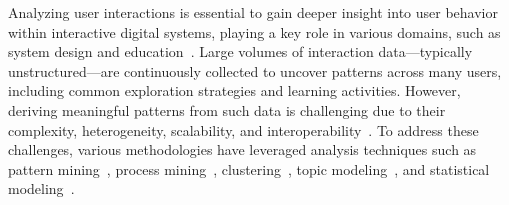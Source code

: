 \documentclass[preprint,journal]{vgtc}            %
\begin{document}
Analyzing user interactions is essential to gain deeper insight into user behavior within interactive digital systems, playing a key role in various domains, such as system design and education~\cite{Webb01Machine}.
Large volumes of interaction data---typically unstructured---are continuously collected to uncover patterns across many users, including common exploration strategies and learning activities.
However, deriving meaningful patterns from such data is challenging due to their complexity, heterogeneity, scalability, and interoperability~\cite{Chen20ViSeq, Chen18D, Wei12Visual, Makanju08LogView}. 
To address these challenges, various methodologies have leveraged analysis techniques such as pattern mining~\cite{Chen20ViSeq, Vrotsou09ActiviTree, Vrotsou19Exploratory}, process mining~\cite{Yeshchenko22Visual}, clustering~\cite{Wu14Visual, Guo18EventThread, Makanju08LogView}, topic modeling~\cite{Xie21PassVizor}, and statistical modeling~\cite{Wu14Visual, Nguyen20VASABI}. 
\end{document}
